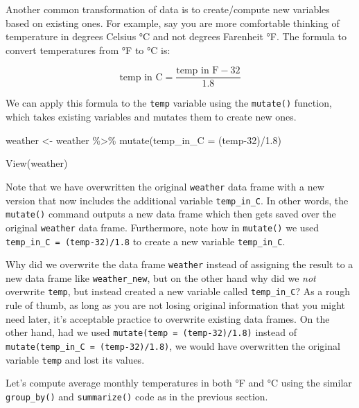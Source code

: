 \documentclass[
  letterpaper,
  DIV=11,
  numbers=noendperiod]{scrreprt}
\newenvironment{Shaded}{\begin{snugshade}}{\end{snugshade}}
\newcommand{\AttributeTok}[1]{\textcolor[rgb]{0.40,0.45,0.13}{#1}}
\newcommand{\DecValTok}[1]{\textcolor[rgb]{0.68,0.00,0.00}{#1}}
\newcommand{\FloatTok}[1]{\textcolor[rgb]{0.68,0.00,0.00}{#1}}
\newcommand{\FunctionTok}[1]{\textcolor[rgb]{0.28,0.35,0.67}{#1}}
\newcommand{\NormalTok}[1]{\textcolor[rgb]{0.00,0.23,0.31}{#1}}
\newcommand{\OtherTok}[1]{\textcolor[rgb]{0.00,0.23,0.31}{#1}}
\newcommand{\SpecialCharTok}[1]{\textcolor[rgb]{0.37,0.37,0.37}{#1}}
\theoremstyle{definition}
\theoremstyle{remark}
\begin{document}
Another common transformation of data is to create/compute new variables
based on existing ones. For example, say you are more comfortable
thinking of temperature in degrees Celsius °C and not degrees Farenheit
°F. The formula to convert temperatures from °F to °C is:

\[
\text{temp in C} = \frac{\text{temp in F} - 32}{1.8}
\]

We can apply this formula to the \texttt{temp} variable using the
\texttt{mutate()} function, which takes existing variables and mutates
them to create new ones.

\begin{Shaded}
\begin{Highlighting}[]
\NormalTok{weather }\OtherTok{\textless{}{-}}\NormalTok{ weather }\SpecialCharTok{\%\textgreater{}\%} 
  \FunctionTok{mutate}\NormalTok{(}\AttributeTok{temp\_in\_C =}\NormalTok{ (temp}\DecValTok{{-}32}\NormalTok{)}\SpecialCharTok{/}\FloatTok{1.8}\NormalTok{)}

\FunctionTok{View}\NormalTok{(weather)}
\end{Highlighting}
\end{Shaded}

Note that we have overwritten the original \texttt{weather} data frame
with a new version that now includes the additional variable
\texttt{temp\_in\_C}. In other words, the \texttt{mutate()} command
outputs a new data frame which then gets saved over the original
\texttt{weather} data frame. Furthermore, note how in \texttt{mutate()}
we used \texttt{temp\_in\_C\ =\ (temp-32)/1.8} to create a new variable
\texttt{temp\_in\_C}.

Why did we overwrite the data frame \texttt{weather} instead of
assigning the result to a new data frame like \texttt{weather\_new}, but
on the other hand why did we \emph{not} overwrite \texttt{temp}, but
instead created a new variable called \texttt{temp\_in\_C}? As a rough
rule of thumb, as long as you are not losing original information that
you might need later, it's acceptable practice to overwrite existing
data frames. On the other hand, had we used
\texttt{mutate(temp\ =\ (temp-32)/1.8)} instead of
\texttt{mutate(temp\_in\_C\ =\ (temp-32)/1.8)}, we would have
overwritten the original variable \texttt{temp} and lost its values.

Let's compute average monthly temperatures in both °F and °C using the
similar \texttt{group\_by()} and \texttt{summarize()} code as in the
previous section.
\end{document}
